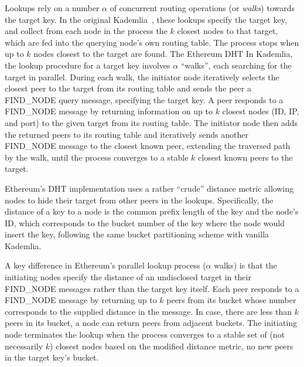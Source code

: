 Lookups rely on a number $\alpha$ of concurrent routing operations (or \emph{walks}) towards the target key.
In the original Kademlia~\cite{maymounkov2002kademlia}, these lookups specify the target key, and collect from each node in the process the $k$ closest nodes to that target, which are fed into the querying node's own routing table.
The process stops when up to $k$ nodes closest to the target are found. 
The Ethereum DHT 
In Kademlia, the lookup procedure for a target key involves $\alpha$ ``walks'', each searching for the target in parallel. During each walk, the initiator node iteratively selects the closest peer to the target from its routing table and sends the peer a FIND\_NODE query message, specifying the target key. A peer responds to a FIND\_NODE message by returning information on up to $k$ closest nodes (\ie ID, IP, and port) to the given target from its routing table. The initiator node then adds the returned peers to its routing table and iteratively sends another FIND\_NODE message to the closest known peer, extending the traversed path by the walk, until the process converges to a stable $k$ closest known peers to the target.


Ethereum's DHT implementation uses a rather ``crude'' distance metric allowing nodes to hide their target from other peers in the lookups. Specifically, the distance of a key to a node is the common prefix length of the key and the node's ID, which corresponds to the bucket number of the key where the node would insert the key, following the same bucket partitioning scheme with vanilla Kademlia.

A key difference in Ethereum's parallel lookup process (\ie $\alpha$ walks) is that the initiating nodes specify the distance of an undisclosed target in their FIND\_NODE messages rather than the target key itself. Each peer responds to a FIND\_NODE message by returning up to $k$ peers from its bucket whose number corresponds to the supplied distance in the message. In case, there are less than $k$ peers in its bucket, a node can return peers from adjacent buckets. The initiating node terminates the lookup when the process converges to a stable set of (not necessarily $k$) closest nodes based on the modified distance metric, \ie no new peers in the target key's bucket.

